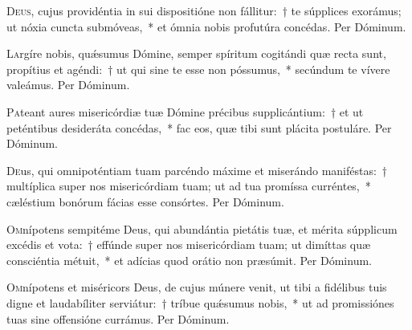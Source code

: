 \documentclass[vesperale_romanum.tex]{subfiles}
\begin{document}
\oratio

\lettrine{D}{eus}, cujus providéntia in sui dispositióne non fállitur:~† te súpplices exorámus; ut nóxia cun\-cta submóveas,~* et ómnia nobis profutúra concédas.
Per Dóminum. 



\oratio

\lettrine{L}{a}rgíre nobis, quǽsumus Dómine, semper spíritum cogitándi quæ recta sunt, propítius et agéndi:~† ut qui sine te esse non póssumus,~* secúndum te vívere valeámus. Per Dóminum. 




\oratio

\lettrine{P}{a}teant aures misericórdiæ tuæ Dómine précibus supplicántium:~† et ut peténtibus desideráta concédas,~* fac eos, quæ tibi sunt plácita postuláre.
Per Dóminum.



\oratio

\lettrine{D}{e}us, qui omnipoténtiam tuam parcéndo máxime et miserándo maniféstas:~† multíplica super nos misericórdiam tuam; ut ad tua promíssa curréntes,~* cæléstium bonórum fácias esse consórtes. Per Dóminum.



\oratio

\lettrine{O}{m}nípotens sempitéme Deus, qui abundántia pietátis tuæ, et mérita súpplicum excédis et vota:~† effúnde super nos misericórdiam tuam; ut dimíttas quæ consciéntia métuit,~* et adícias quod orátio non præsúmit. Per Dóminum.



\oratio

\lettrine{O}{m}nípotens et miséricors Deus, de cujus múnere venit, ut tibi a fidélibus tuis digne et laudabíliter serviátur:~† tríbue quǽsumus nobis,~* ut ad promissiónes tuas sine offensióne currámus. Per Dóminum.
\end{document}
